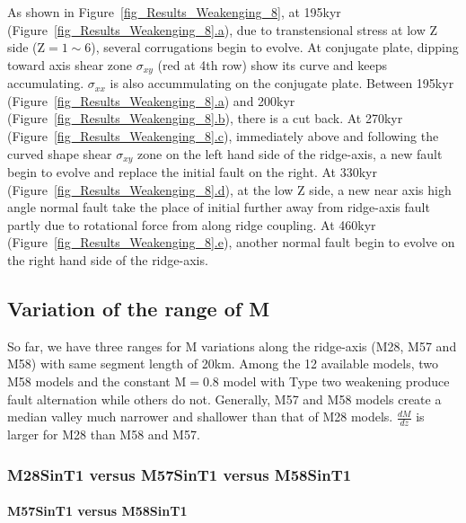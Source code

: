 As shown in Figure~\hyperref[fig_Results_Weakenging_8]{\ref{fig_Results_Weakenging_8}}, at 195kyr (Figure~\hyperref[fig_Results_Weakenging_8]{\ref{fig_Results_Weakenging_8}.a}), due to transtensional stress at low Z side (Z$=1\sim6$), several corrugations begin to evolve. At conjugate plate, dipping toward axis shear zone $\sigma_{xy}$ (red at 4th row) show its curve and keeps accumulating. $\sigma_{xx}$ is also accummulating on the conjugate plate. Between 195kyr (Figure~\hyperref[fig_Results_Weakenging_8]{\ref{fig_Results_Weakenging_8}.a}) and 200kyr (Figure~\hyperref[fig_Results_Weakenging_8]{\ref{fig_Results_Weakenging_8}.b}), there is a cut back. At 270kyr (Figure~\hyperref[fig_Results_Weakenging_8]{\ref{fig_Results_Weakenging_8}.c}), immediately above and following the curved shape shear $\sigma_{xy}$ zone on the left hand side of the ridge-axis, a new fault begin to evolve and replace the initial fault on the right. At 330kyr (Figure~\hyperref[fig_Results_Weakenging_8]{\ref{fig_Results_Weakenging_8}.d}), at the low Z side, a new near axis high angle normal fault take the place of initial further away from ridge-axis fault partly due to rotational force from along ridge coupling. At 460kyr (Figure~\hyperref[fig_Results_Weakenging_8]{\ref{fig_Results_Weakenging_8}.e}), another normal fault begin to evolve on the right hand side of the ridge-axis.

\subsection{Variation of the range of M}
So far, we have three ranges for M variations along the ridge-axis (M28, M57 and M58) with same segment length of 20km. Among the 12 available models, two M58 models and the constant M$=0.8$ model with Type two weakening produce fault alternation while others do not. Generally, M57 and M58 models create a median valley much narrower and shallower than that of M28 models. $\frac{dM}{dz}$ is larger for M28 than M58 and M57.

\subsubsection{M28SinT1 versus M57SinT1 versus M58SinT1}

\paragraph{M57SinT1 versus M58SinT1}\label{M57SinT1 versus M58SinT1}

